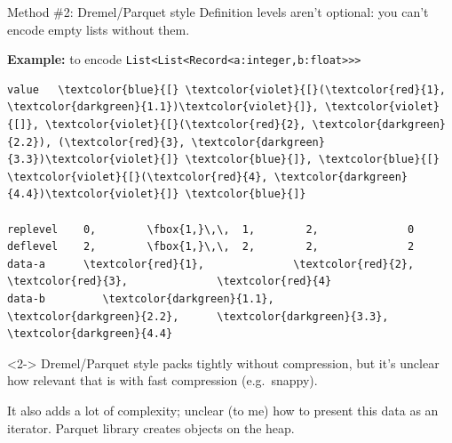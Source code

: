 \documentclass{beamer}
\begin{document}
\begin{frame}[fragile]{Method \#2: Dremel/Parquet style}
\vspace{0.5 cm}
Definition levels aren't optional: you can't encode empty lists without them.

\vspace{0.5 cm}
{\bf Example:} to encode {\tt\footnotesize List<List<Record<a:integer,b:float>>>}

\scriptsize\bf
\begin{Verbatim}[commandchars=\\\{\}]
value   \textcolor{blue}{[} \textcolor{violet}{[}(\textcolor{red}{1}, \textcolor{darkgreen}{1.1})\textcolor{violet}{]}, \textcolor{violet}{[]}, \textcolor{violet}{[}(\textcolor{red}{2}, \textcolor{darkgreen}{2.2}), (\textcolor{red}{3}, \textcolor{darkgreen}{3.3})\textcolor{violet}{]} \textcolor{blue}{]}, \textcolor{blue}{[} \textcolor{violet}{[}(\textcolor{red}{4}, \textcolor{darkgreen}{4.4})\textcolor{violet}{]} \textcolor{blue}{]}

replevel    0,        \fbox{1,}\,\,  1,        2,              0
deflevel    2,        \fbox{1,}\,\,  2,        2,              2
data-a      \textcolor{red}{1},              \textcolor{red}{2},        \textcolor{red}{3},              \textcolor{red}{4}
data-b         \textcolor{darkgreen}{1.1},            \textcolor{darkgreen}{2.2},      \textcolor{darkgreen}{3.3},            \textcolor{darkgreen}{4.4}
\end{Verbatim}

\normalsize\sf
\vspace{0.3 cm}
\begin{uncoverenv}<2->
Dremel/Parquet style packs tightly without compression, but it's unclear how relevant that is with fast compression (e.g.\ snappy).

\vspace{0.25 cm}
It also adds a lot of complexity; unclear (to me) how to present this data as an iterator. Parquet library creates objects on the heap.
\end{uncoverenv}
\end{frame}
\end{document}
